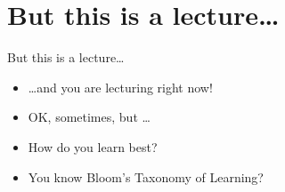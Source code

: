 ﻿\section{But this is a lecture\ldots}

\begin{frame}{But this is a lecture\ldots}
\begin{itemize}
\item \ldots and you are lecturing right now!
\item OK, sometimes, but \ldots
\end{itemize}
\begin{itemize}
\item How do you learn best?
\item You know Bloom's Taxonomy of Learning?
\end{itemize}
\end{frame}

